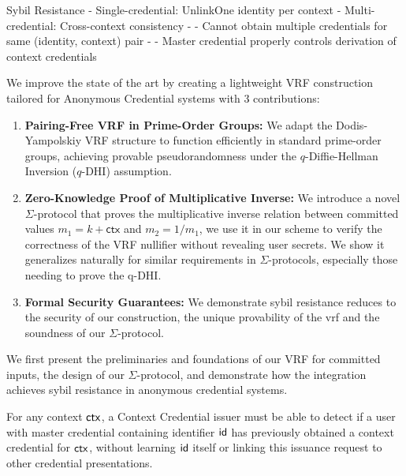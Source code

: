 Sybil Resistance
- Single-credential: UnlinkOne identity per context
- Multi-credential: Cross-context consistency
- - Cannot obtain multiple credentials for same (identity, context) pair
- - Master credential properly controls derivation of context credentials


\noindent We improve the state of the art by creating a lightweight VRF construction tailored for Anonymous Credential systems with 3 contributions:
\begin{enumerate}
        \item \textbf{Pairing-Free VRF in Prime-Order Groups:} We adapt the Dodis-Yampolskiy VRF structure to function efficiently in standard prime-order groups, achieving provable pseudorandomness under the $q$-Diffie-Hellman Inversion ($q$-DHI) assumption.

        \item \textbf{Zero-Knowledge Proof of Multiplicative Inverse:} We introduce a novel $\Sigma$-protocol that proves the multiplicative inverse relation between committed values $m_1 = k + \textsf{ctx}$ and $m_2 = 1/m_1$, we use it in our scheme to verify the correctness of the VRF nullifier without revealing user secrets. We show it generalizes naturally for similar requirements in $\Sigma$-protocols, especially those needing to prove the q-DHI.

         \item \textbf{Formal Security Guarantees:} We demonstrate sybil resistance reduces to the security of our construction, the unique provability of the vrf and the soundness of our $\Sigma$-protocol.
\end{enumerate}
We first present the preliminaries and foundations of our VRF for committed inputs, the design of our $\Sigma$-protocol, and demonstrate how the integration achieves sybil resistance in anonymous credential systems.

\begin{definition}
For any context $\mathsf{ctx}$, a Context Credential issuer must be able to detect if a user with master credential containing identifier $\mathsf{id}$ has previously obtained a context credential for $\mathsf{ctx}$, without learning $\mathsf{id}$ itself or linking this issuance request to other credential presentations.
\end{definition}

